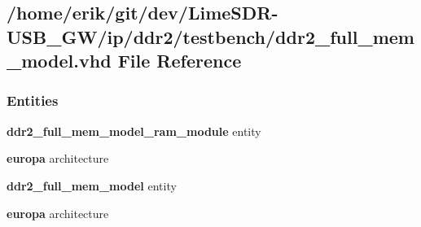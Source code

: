 \subsection{/home/erik/git/dev/\+Lime\+S\+D\+R-\/\+U\+S\+B\+\_\+\+G\+W/ip/ddr2/testbench/ddr2\+\_\+full\+\_\+mem\+\_\+model.vhd File Reference}
\label{ddr2__full__mem__model_8vhd}
\subsubsection*{Entities}
\begin{DoxyCompactItemize}
\item 
{\bf ddr2\+\_\+full\+\_\+mem\+\_\+model\+\_\+ram\+\_\+module} entity
\item 
{\bf europa} architecture
\item 
{\bf ddr2\+\_\+full\+\_\+mem\+\_\+model} entity
\item 
{\bf europa} architecture
\end{DoxyCompactItemize}
